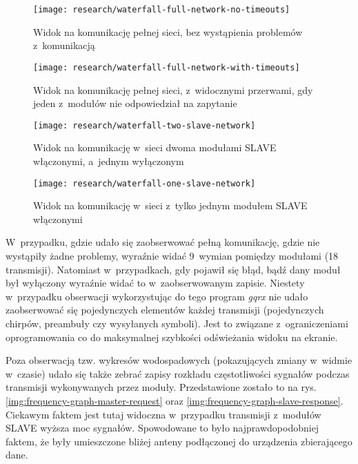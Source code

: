 \begin{figure}[!htbp]
    \centering
    \texttt{[image: research/waterfall-full-network-no-timeouts]}
    \caption{\label{img:waterfall-full-no-timeouts}Widok na komunikację pełnej sieci, bez wystąpienia problemów
        z~komunikacją}
\end{figure}

\begin{figure}[!htbp]
    \centering
    \texttt{[image: research/waterfall-full-network-with-timeouts]}
    \caption{\label{img:waterfall-full-with-timeouts}Widok na komunikację pełnej sieci, z~widocznymi przerwami, gdy
        jeden z~modułów nie odpowiedział na zapytanie}
\end{figure}

\begin{figure}[!htbp]
    \centering
    \texttt{[image: research/waterfall-two-slave-network]}
    \caption{\label{img:waterfall-one-slave}Widok na komunikację w~sieci dwoma modułami SLAVE włączonymi, a~jednym
        wyłączonym}
\end{figure}

\begin{figure}[!htbp]
    \centering
    \texttt{[image: research/waterfall-one-slave-network]}
    \caption{\label{img:waterfall-two-slave}Widok na komunikację w~sieci z~tylko jednym modułem SLAVE włączonymi}
\end{figure}

\FloatBarrier
W~przypadku, gdzie udało się zaobserwować pełną komunikację, gdzie nie wystąpiły żadne problemy, wyraźnie widać 9~wymian
pomiędzy modułami (18 transmisji). Natomiast w~przypadkach, gdy pojawił się błąd, bądź dany moduł był wyłączony wyraźnie
widać to w~zaobserwowanym zapisie. Niestety w~przypadku obserwacji wykorzystując do tego program \textsl{gqrx} nie udało
zaobserwować się pojedynczych elementów każdej transmisji (pojedynczych chirpów, preambuły czy wysyłanych symboli). Jest
to związane z~ograniczeniami oprogramowania co do maksymalnej szybkości odświeżania widoku na ekranie.

Poza obserwacją tzw. wykresów wodospadowych (pokazujących zmiany w~widmie w~czasie) udało się także zebrać zapisy
rozkładu częstotliwości sygnałów podczas transmisji wykonywanych przez moduły. Przedstawione zostało to na rys.
\ref{img:frequency-graph-master-request} oraz \ref{img:frequency-graph-slave-response}. Ciekawym faktem jest tutaj
widoczna w~przypadku transmisji z~modułów SLAVE wyższa moc sygnałów. Spowodowane to było najprawdopodobniej faktem, że
były umieszczone bliżej anteny podłączonej do urządzenia zbierającego dane.

